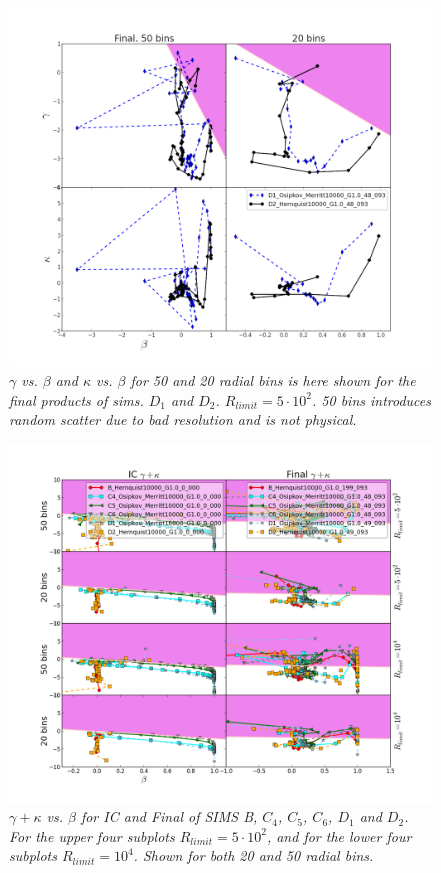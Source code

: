 \begin{figure}[h!]
	\centering
		\includegraphics[width=1.0\linewidth]{img/D1D2_beta_gamma_kappa_Final.png}
		{\medskip\caption{\textsl{$\gamma$ vs. $\beta$ and $\kappa$ vs. $\beta$ for 50 and 20 radial bins is here shown for the final products of sims. $D_1$ and $D_2$. $R_{limit} = 5 \cdot 10^2$. 50 bins introduces random scatter due to bad resolution and is not physical.
\label{fig:Rv}}}}
\end{figure} 

\begin{figure}[h!]
	\centering
		\includegraphics[width=1.0\linewidth]{img/Attractor_fig4.png}
		{\medskip\caption{\textsl{$\gamma + \kappa$ vs. $\beta$ for IC and Final of SIMS B, 
$C_4$, $C_5$, $C_6$, $D_1$ and $D_2$. For the upper four subplots $R_{limit} = 5 \cdot 10^2$, and for the lower four subplots $R_{limit} = 10^4$. Shown for both 20 and 50 radial bins.
\label{fig:Rv}}}}
\end{figure} 


